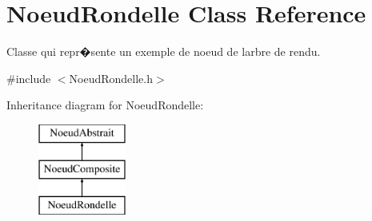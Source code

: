 \hypertarget{class_noeud_rondelle}{}\section{Noeud\+Rondelle Class Reference}
\label{class_noeud_rondelle}


Classe qui repr�sente un exemple de noeud de l\textquotesingle{}arbre de rendu.  




{\ttfamily \#include $<$Noeud\+Rondelle.\+h$>$}

Inheritance diagram for Noeud\+Rondelle\+:\begin{figure}[H]
\begin{center}
\leavevmode
\includegraphics[height=3.000000cm]{class_noeud_rondelle}
\end{center}
\end{figure}
